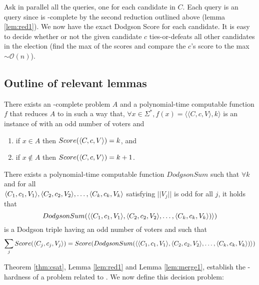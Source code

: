 \begin{claimproof}
    Ask in parallel all the  queries,
    one for each candidate in $C$.
    Each query is an \np query since  is \np-complete by
    the second reduction outlined above (lemma \ref{lem:red1}).
    We now have the exact Dodgson Score for each candidate.
    It is easy to decide
    whether or not the given candidate $c$ ties-or-defeats all other candidates in
    the election (find the max of the scores and compare the $c$'s score to
    the max $\sim\mathcal{O}(n)$).
\end{claimproof}

\subsection{Outline of relevant lemmas}

\begin{lemma} \label{lem:red1}
    There exists an \np-complete problem $A$ and a polynomial-time
    computable function $f$ that reduces $A$ to \dscore in such
    a way that, $\forall x \in \Sigma^*,
    f(x) = \langle \langle C,c,V \rangle, k\rangle $
    is an instance of \dscore with an odd number of voters and
    \begin{enumerate}
        \item if $x\in A$ then $Score(\langle C,c,V \rangle) = k$, and
        \item if $x\notin A$ then $Score(\langle C,c,V \rangle) = k+1$.
    \end{enumerate}
\end{lemma}

\begin{lemma} \label{lem:merge1}
    There exists a polynomial-time computable function
    $DodgsonSum$ such that $\forall k$ and for all\\
    $\langle C_{1},c_{1},V_{1} \rangle,\langle C_{2},c_{2},V_{2} \rangle, \dots, \langle C_{k},c_{k},V_{k} \rangle$ satisfying
    $||V_j||$ is odd for all $ j$, it holds that
    \[DodgsonSum(\langle \langle C_{1},c_{1},V_{1} \rangle,\langle C_{2},c_{2},V_{2} \rangle, \dots,
    \langle C_{k},c_{k},V_{k} \rangle) \rangle)\]
    is a Dodgson triple having an odd number of voters and such that
    \[\sum_j Score(\langle C_{j},c_{j},V_{j} \rangle) =
    Score(DodgsonSum(\langle \langle C_{1},c_{1},V_{1} \rangle,\langle C_{2},c_{2},V_{2} \rangle, \dots,
    \langle C_{k},c_{k},V_{k} \rangle) \rangle)\]
\end{lemma}

Theorem \ref{thm:csat}, Lemma \ref{lem:red1} and Lemma
\ref{lem:merge1}, establish the \tp-hardness of a problem related to
. We now define this decision problem:

